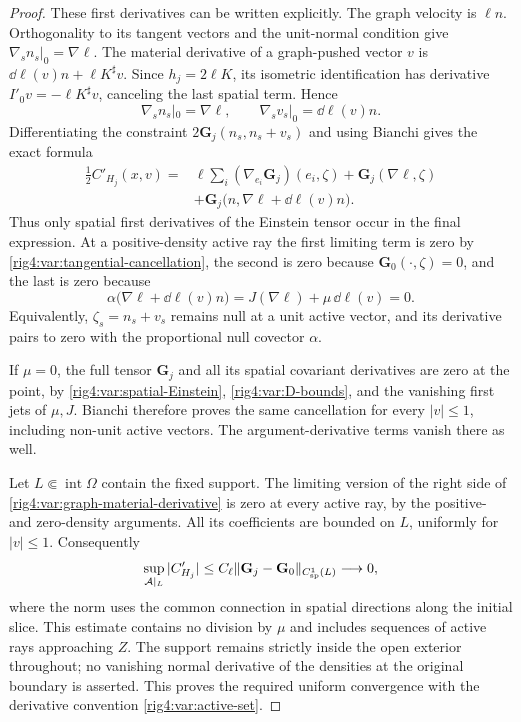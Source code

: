 \begin{proof}
These first derivatives can be written explicitly. The graph velocity is
$\ell n$. Orthogonality to its tangent vectors and the unit-normal
condition give $\nabla_s n_s|_0=\nabla\ell$.
The material derivative of a graph-pushed vector $v$ is
$\dd\ell(v)n+\ell K^\sharp v$. Since $h_j=2\ell K$, its isometric
identification has derivative $I'_0v=-\ell K^\sharp v$, canceling the
last spatial term. Hence
\begin{equation}
 \nabla_s n_s|_0=\nabla\ell,\qquad
 \nabla_s v_s|_0=\dd\ell(v)n.
\label{rig4:var:argument-derivatives}
\end{equation}
Differentiating the constraint $2\mathbf G_j(n_s,n_s+v_s)$ and using
Bianchi gives the exact formula
\begin{align}
 \tfrac12 C'_{H_j}(x,v)
  ={}&\ell\sum_i(\nabla_{e_i}\mathbf G_j)(e_i,\zeta)
       +\mathbf G_j(\nabla\ell,\zeta)\nonumber\\
    &+\mathbf G_j\bigl(n,\nabla\ell+\dd\ell(v)n\bigr).
\label{rig4:var:graph-material-derivative}
\end{align}
Thus only spatial first derivatives of the Einstein tensor occur in the
final expression. At a positive-density active ray the first limiting
term is zero by \eqref{rig4:var:tangential-cancellation}, the second is zero
because $\mathbf G_0(\cdot,\zeta)=0$, and the last is zero because
\[
 \alpha\bigl(\nabla\ell+\dd\ell(v)n\bigr)
       =J(\nabla\ell)+\mu\,\dd\ell(v)=0.
\]
Equivalently, $\zeta_s=n_s+v_s$ remains null at a unit active vector,
and its derivative pairs to zero with the proportional null covector
$\alpha$.

If $\mu=0$, the full tensor $\mathbf G_j$ and all its spatial covariant
derivatives are zero at the point, by \eqref{rig4:var:spatial-Einstein},
\eqref{rig4:var:D-bounds}, and the vanishing first jets of $\mu,J$.
Bianchi therefore proves the same cancellation for every $|v|\le1$,
including non-unit active vectors. The argument-derivative terms vanish
there as well.

Let $L\Subset\operatorname{int}\Omega$ contain the fixed support.
The limiting version of the right side of
\eqref{rig4:var:graph-material-derivative} is zero at every active ray, by the
positive- and zero-density arguments. All its coefficients are bounded
on $L$, uniformly for $|v|\le1$. Consequently
\[
 \sup_{\mathcal A|_L}|C'_{H_j}|
       \le C_\ell\|\mathbf G_j-\mathbf G_0\|_{C^1_{\rm sp}(L)}
       \longrightarrow0,
\]
where the norm uses the common connection in spatial directions along
the initial slice. This estimate contains no division by $\mu$ and
includes sequences of active rays approaching $Z$. The support remains
strictly inside the open exterior throughout; no vanishing normal
derivative of the densities at the original boundary is asserted.
This proves the required uniform convergence with the derivative
convention \eqref{rig4:var:active-set}.
\end{proof}

